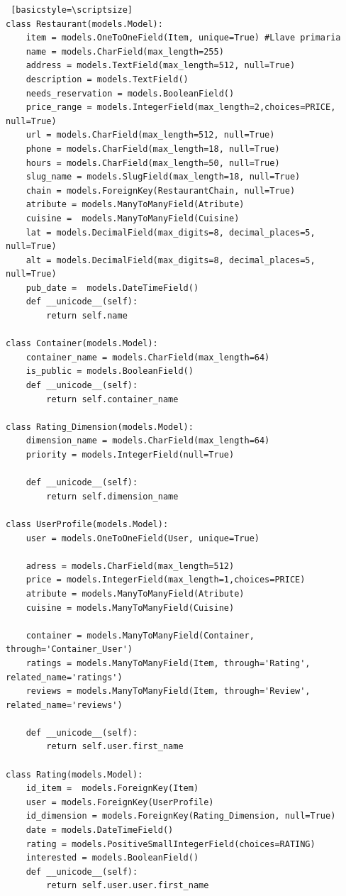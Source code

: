 \documentclass[12pt,letterpaper,oneside] {memoir}
\begin{document}
\begin{lstlisting} [basicstyle=\scriptsize]
class Restaurant(models.Model):
    item = models.OneToOneField(Item, unique=True) #Llave primaria
    name = models.CharField(max_length=255)
    address = models.TextField(max_length=512, null=True)
    description = models.TextField()
    needs_reservation = models.BooleanField()
    price_range = models.IntegerField(max_length=2,choices=PRICE, null=True)
    url = models.CharField(max_length=512, null=True)
    phone = models.CharField(max_length=18, null=True)
    hours = models.CharField(max_length=50, null=True)
    slug_name = models.SlugField(max_length=18, null=True)
    chain = models.ForeignKey(RestaurantChain, null=True)
    atribute = models.ManyToManyField(Atribute)
    cuisine =  models.ManyToManyField(Cuisine)
    lat = models.DecimalField(max_digits=8, decimal_places=5, null=True) 
    alt = models.DecimalField(max_digits=8, decimal_places=5, null=True)
    pub_date =  models.DateTimeField()    
    def __unicode__(self):
        return self.name

class Container(models.Model):
    container_name = models.CharField(max_length=64) 
    is_public = models.BooleanField()
    def __unicode__(self):
        return self.container_name

class Rating_Dimension(models.Model):
    dimension_name = models.CharField(max_length=64)
    priority = models.IntegerField(null=True)
    
    def __unicode__(self):
        return self.dimension_name

class UserProfile(models.Model):
    user = models.OneToOneField(User, unique=True)

    adress = models.CharField(max_length=512) 
    price = models.IntegerField(max_length=1,choices=PRICE)
    atribute = models.ManyToManyField(Atribute)
    cuisine = models.ManyToManyField(Cuisine)

    container = models.ManyToManyField(Container, through='Container_User')
    ratings = models.ManyToManyField(Item, through='Rating', related_name='ratings')
    reviews = models.ManyToManyField(Item, through='Review', related_name='reviews')
  
    def __unicode__(self):
        return self.user.first_name

class Rating(models.Model):
    id_item =  models.ForeignKey(Item) 
    user = models.ForeignKey(UserProfile) 
    id_dimension = models.ForeignKey(Rating_Dimension, null=True)
    date = models.DateTimeField()
    rating = models.PositiveSmallIntegerField(choices=RATING)
    interested = models.BooleanField()
    def __unicode__(self):
        return self.user.user.first_name
    

\end{lstlisting}
\end{document}
